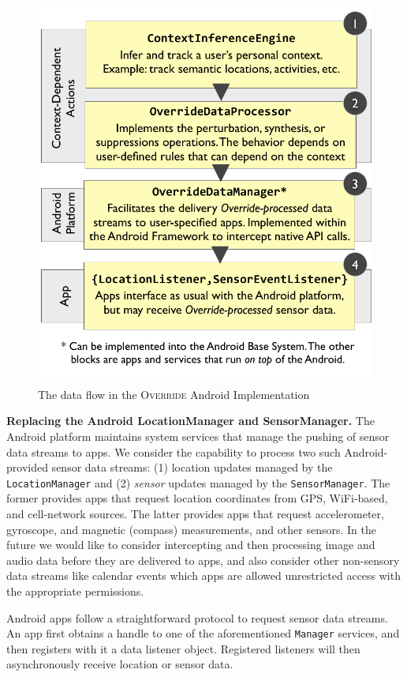 \documentclass[10pt]{sensys-proc}
\begin{document}
\begin{figure}
\includegraphics[width=\columnwidth]{../figures/android_impl4.pdf}
\caption{The data flow in the \textsc{Override} Android Implementation}
\label{fig:android_impl}
\end{figure}

\textbf{Replacing the Android LocationManager and SensorManager.} The Android platform maintains system services that manage the pushing of sensor data streams to apps. We consider the capability to process two such Android-provided sensor data streams: (1) location updates managed by the \texttt{LocationManager} and (2) \emph{sensor} updates managed by the \texttt{SensorManager}. The former provides apps that request location coordinates from GPS, WiFi-based, and cell-network sources. The latter provides apps that request accelerometer, gyroscope, and magnetic (compass) measurements, and other sensors. In the future we would like to consider intercepting and then processing image and audio data before they are delivered to apps, and also consider other non-sensory data streams like calendar events which apps are allowed unrestricted access with the appropriate permissions.

Android apps follow a straightforward protocol to request sensor data streams. An app first obtains a handle to one of the aforementioned \texttt{Manager} services, and then registers with it a data listener object. Registered listeners will then asynchronously receive location or sensor data.
\end{document}
